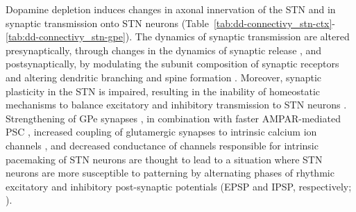 Dopamine depletion induces changes in axonal innervation of the STN
and in synaptic transmission onto STN neurons (Table~\ref{tab:dd-connectivy_stn-ctx}-\ref{tab:dd-connectivy_stn-gpe}).
The dynamics of synaptic transmission are altered presynaptically, through changes
in the dynamics of synaptic release \cite{baufreton_d2-like_2008}, and postsynaptically,
by modulating the subunit composition of synaptic receptors \cite{chu_loss_2017}
and altering dendritic branching and spine formation \cite{chu_loss_2017,wang_impaired_2018}.
Moreover, synaptic plasticity in the STN is impaired, resulting in the inability of
homeostatic mechanisms to balance excitatory and inhibitory transmission to STN neurons
\cite{chu_heterosynaptic_2015,chu_loss_2017}. Strengthening of GPe synapses
\cite{fan_proliferation_2012,chu_heterosynaptic_2015,baufreton_d2-like_2008,shen_dopamine_2005}
, in combination with faster AMPAR-mediated PSC \cite{chu_loss_2017},
increased coupling of glutamergic synapses to intrinsic calcium ion channels
\cite{chu_loss_2017,ramanathan_d2-like_2008}, and decreased conductance
of channels responsible for intrinsic pacemaking of STN neurons
\cite{loucif_depolarisation_2008,zhu_pharmacological_2002,mciver_maladaptive_2019}
are thought to lead to a situation where STN neurons are more susceptible
to patterning by alternating phases of rhythmic excitatory and inhibitory
post-synaptic potentials (EPSP and IPSP, respectively;  \cite{baufreton_enhancement_2005,hallworth_globus_2005,bevan_cellular_2006,mallet_disrupted_2008,mallet_dichotomous_2012,chu_heterosynaptic_2015}).
%

